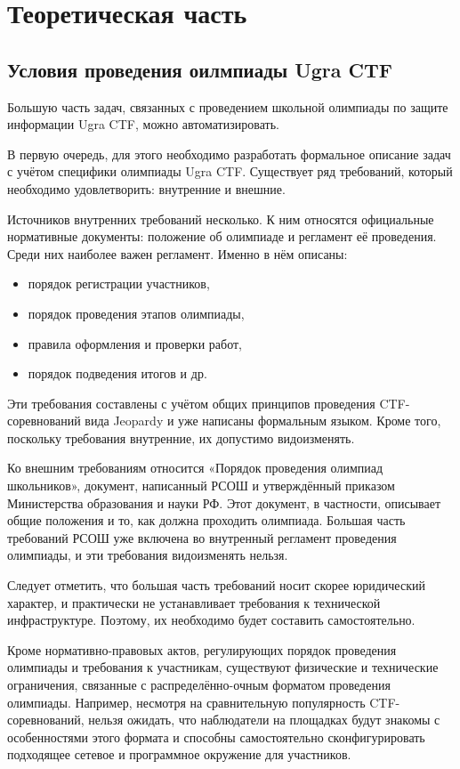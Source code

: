 \chapter{Теоретическая часть}

\section{Условия проведения оилмпиады Ugra CTF}

Большую часть задач, связанных с проведением школьной олимпиады по защите информации Ugra CTF, можно автоматизировать.

В первую очередь, для этого необходимо разработать формальное описание задач с учётом специфики олимпиады Ugra CTF. Существует ряд требований, который необходимо удовлетворить: внутренние и внешние.

Источников внутренних требований несколько. К ним относятся официальные нормативные документы: положение об олимпиаде и регламент её проведения. Среди них наиболее важен регламент. Именно в нём описаны:

\begin{itemize}
\item порядок регистрации участников,
\item порядок проведения этапов олимпиады,
\item правила оформления и проверки работ,
\item порядок подведения итогов и др.
\end{itemize}

Эти требования составлены с учётом общих принципов проведения CTF-соревнований вида Jeopardy и уже написаны формальным языком. Кроме того, поскольку требования внутренние, их допустимо видоизменять.

Ко внешним требованиям относится «Порядок проведения олимпиад школьников», документ, написанный РСОШ и утверждённый приказом Министерства образования и науки РФ. Этот документ, в частности, описывает общие положения и то, как должна проходить олимпиада. Большая часть требований РСОШ уже включена во внутренный регламент проведения олимпиады, и эти требования видоизменять нельзя.

Следует отметить, что большая часть требований носит скорее юридический характер, и практически не устанавливает требования к технической инфраструктуре. Поэтому, их необходимо будет составить самостоятельно.

Кроме нормативно-правовых актов, регулирующих порядок проведения олимпиады и требования к участникам, существуют физические и технические ограничения, связанные с распределённо-очным форматом проведения олимпиады. Например, несмотря на сравнительную популярность CTF-соревнований, нельзя ожидать, что наблюдатели на площадках будут знакомы с особенностями этого формата и способны самостоятельно сконфигурировать подходящее сетевое и программное окружение для участников.

